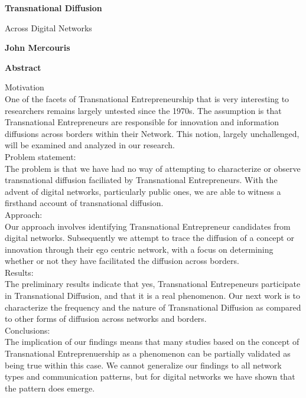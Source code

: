 \thispagestyle{plain}
\begin{center}
    \Large
    \textbf{Transnational Diffusion}
    
    \vspace{0.4cm}
    \large
    Across Digital Networks
    
    \vspace{0.4cm}
    \textbf{John Mercouris}
    
    \vspace{0.9cm}
    \textbf{Abstract}
\end{center}

Motivation
\\
One of the facets of Transnational Entrepreneurship that is very interesting to researchers remains largely untested since the 1970s. The assumption is that Transnational Entrepreneurs are responsible for innovation and information diffusions across borders within their Network. This notion, largely unchallenged, will be examined and analyzed in our research.
\\

Problem statement:
\\
The problem is that we have had no way of attempting to characterize or observe transnational diffusion faciliated by Transnational Entrepreneurs. With the advent of digital networks, particularly public ones, we are able to witness a firsthand account of transnational diffusion.
\\

Approach:
\\
Our approach involves identifying Transnational Entrepreneur candidates from digital networks. Subsequently we attempt to trace the diffusion of a concept or innovation through their ego centric network, with a focus on determining whether or not they have facilitated the diffusion across borders.
\\

Results:
\\
The preliminary results indicate that yes, Transnational Entrepeneurs participate in Transnational Diffusion, and that it is a real phenomenon. Our next work is to characterize the frequency and the nature of Transnational Diffusion as compared to other forms of diffusion across networks and borders.
\\

Conclusions:
\\
The implication of our findings means that many studies based on the concept of Transnational Entreprenuership as a phenomenon can be partially validated as being true within this case. We cannot generalize our findings to all network types and communication patterns, but for digital networks we have shown that the pattern does emerge.
\\






